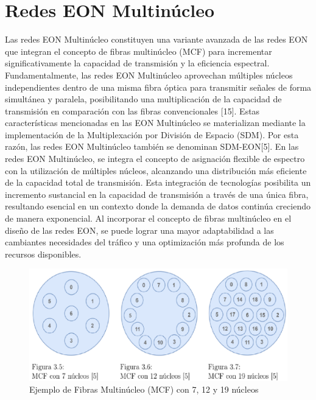 \section{Redes EON Multinúcleo}
Las redes EON Multinúcleo constituyen una variante avanzada de las redes EON que integran el concepto de fibras multinúcleo (MCF) para incrementar significativamente la capacidad de transmisión y la eficiencia espectral. Fundamentalmente, las redes EON Multinúcleo aprovechan múltiples núcleos independientes dentro de una misma fibra óptica para transmitir señales de forma simultánea y paralela, posibilitando una multiplicación de la capacidad de transmisión en comparación con las fibras convencionales [15].
 Estas características mencionadas en las EON Multinúcleo se materializan mediante la implementación de la Multiplexación por División de Espacio (SDM). Por esta razón, las redes EON Multinúcleo también se denominan SDM-EON[5]. En las redes EON Multinúcleo, se integra el concepto de asignación flexible de espectro con la utilización de múltiples núcleos, alcanzando una distribución más eficiente de la capacidad total de transmisión. Esta integración de tecnologías posibilita un incremento sustancial en la capacidad de transmisión a través de una única fibra, resultando esencial en un contexto donde la demanda de datos continúa creciendo de manera exponencial.
  Al incorporar el concepto de fibras multinúcleo en el diseño de las redes EON, se puede lograr una mayor adaptabilidad a las cambiantes necesidades del tráfico y una optimización más profunda de los recursos disponibles.
%

\begin{figure}[H]
    \centering
    \includegraphics[width=1\textwidth]{capitulos/img/MCF_NUCLEOS.png}
    \caption{Ejemplo de Fibras Multinúcleo (MCF) con 7, 12 y 19 núcleos}
    \label{fig:MCF_NUCLEOS}
\end{figure}
%

